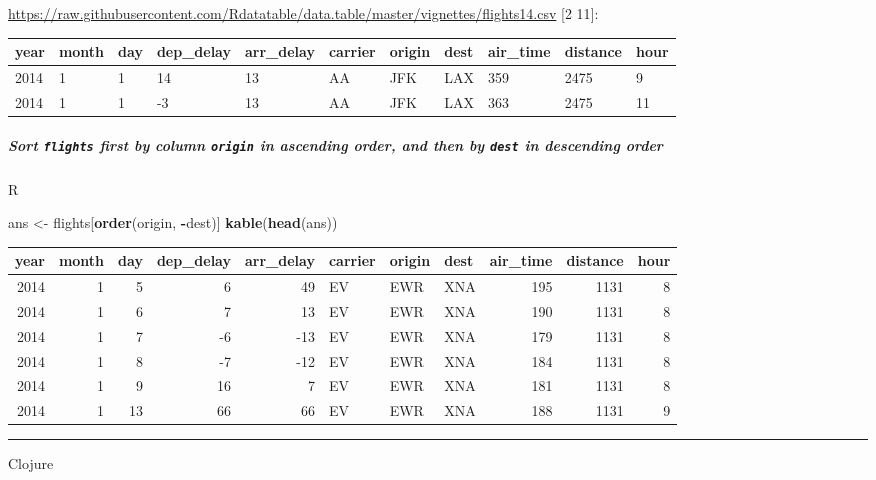 \documentclass[]{article}
\newenvironment{Shaded}{\begin{snugshade}}{\end{snugshade}}
\newcommand{\KeywordTok}[1]{\textcolor[rgb]{0.13,0.29,0.53}{\textbf{#1}}}
\newcommand{\NormalTok}[1]{#1}
\newcommand{\OperatorTok}[1]{\textcolor[rgb]{0.81,0.36,0.00}{\textbf{#1}}}
\newcommand{\StringTok}[1]{\textcolor[rgb]{0.31,0.60,0.02}{#1}}
\let\oldsubparagraph\subparagraph
\renewcommand{\subparagraph}[1]{\oldsubparagraph{#1}\mbox{}}
\begin{document}
\url{https://raw.githubusercontent.com/Rdatatable/data.table/master/vignettes/flights14.csv}
{[}2 11{]}:

\begin{longtable}[]{@{}lllllllllll@{}}
\toprule
year & month & day & dep\_delay & arr\_delay & carrier & origin & dest &
air\_time & distance & hour\tabularnewline
\midrule
\endhead
2014 & 1 & 1 & 14 & 13 & AA & JFK & LAX & 359 & 2475 & 9\tabularnewline
2014 & 1 & 1 & -3 & 13 & AA & JFK & LAX & 363 & 2475 & 11\tabularnewline
\bottomrule
\end{longtable}

\hypertarget{sort-flights-first-by-column-origin-in-ascending-order-and-then-by-dest-in-descending-order}{%
\subparagraph{\texorpdfstring{Sort \texttt{flights} first by column
\texttt{origin} in ascending order, and then by \texttt{dest} in
descending
order}{Sort flights first by column origin in ascending order, and then by dest in descending order}}\label{sort-flights-first-by-column-origin-in-ascending-order-and-then-by-dest-in-descending-order}}

R

\begin{Shaded}
\begin{Highlighting}[]
\NormalTok{ans <-}\StringTok{ }\NormalTok{flights[}\KeywordTok{order}\NormalTok{(origin, }\OperatorTok{-}\NormalTok{dest)]}
\KeywordTok{kable}\NormalTok{(}\KeywordTok{head}\NormalTok{(ans))}
\end{Highlighting}
\end{Shaded}

\begin{longtable}[]{@{}rrrrrlllrrr@{}}
\toprule
year & month & day & dep\_delay & arr\_delay & carrier & origin & dest &
air\_time & distance & hour\tabularnewline
\midrule
\endhead
2014 & 1 & 5 & 6 & 49 & EV & EWR & XNA & 195 & 1131 & 8\tabularnewline
2014 & 1 & 6 & 7 & 13 & EV & EWR & XNA & 190 & 1131 & 8\tabularnewline
2014 & 1 & 7 & -6 & -13 & EV & EWR & XNA & 179 & 1131 & 8\tabularnewline
2014 & 1 & 8 & -7 & -12 & EV & EWR & XNA & 184 & 1131 & 8\tabularnewline
2014 & 1 & 9 & 16 & 7 & EV & EWR & XNA & 181 & 1131 & 8\tabularnewline
2014 & 1 & 13 & 66 & 66 & EV & EWR & XNA & 188 & 1131 & 9\tabularnewline
\bottomrule
\end{longtable}

\begin{center}\rule{0.5\linewidth}{0.5pt}\end{center}

Clojure
\end{document}
